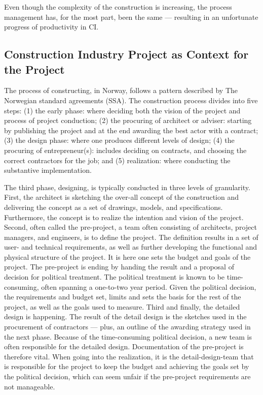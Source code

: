 Even though the complexity of the construction is increasing, the process management has, for the most part, been the same — resulting in an unfortunate progress of productivity in CI. 

\subsection{Construction Industry Project as Context for the Project} \label{sec:CI_context}
The process of constructing, in Norway, follows a pattern described by The Norwegian standard agreements (SSA). The construction process divides into five steps: (1) the early phase: where deciding both the vision of the project and process of project conduction; (2) the procuring of architect or adviser: starting by publishing the project and at the end awarding the best actor with a contract; (3) the design phase: where one produces different levels of  design; (4) the procuring of entrepreneur(s): includes deciding on contracts, and choosing the correct contractors for the job; and (5) realization: where conducting the substantive implementation. 

The third phase, designing, is typically conducted in three levels of granularity. First, the architect is sketching the over-all concept of the construction and delivering the concept as a set of drawings, models, and specifications. Furthermore, the concept is to realize the intention and vision of the project. Second, often called the pre-project, a team often consisting of architects, project managers, and engineers, is to define the project. The definition results in a set of user- and technical requirements, as well as further developing the functional and physical structure of the project. It is here one sets the budget and goals of the project. The pre-project is ending by handing the result and a proposal of decision for political treatment. The political treatment is known to be time-consuming, often spanning a one-to-two year period. Given the political decision, the requirements and budget set, limits and sets the basis for the rest of the project, as well as the goals used to measure. Third and finally, the detailed design is happening. The result of the detail design is the sketches used in the procurement of contractors — plus, an outline of the awarding strategy used in the next phase. Because of the time-consuming political decision, a new team is often responsible for the detailed design. Documentation of the pre-project is therefore vital. When going into the realization, it is the detail-design-team that is responsible for the project to keep the budget and achieving the goals set by the political decision, which can seem unfair if the pre-project requirements are not manageable.

